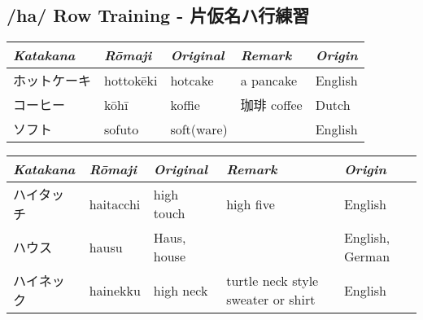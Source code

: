 \subsection{/ha/ Row Training - 片仮名ハ行練習}\label{sec:HaRowTraining}
\Padding
\begin{longtable}[c]{p{3cm}p{2cm}p{3cm}p{5cm}p{2cm}}
\textit{Katakana}&\textit{Rōmaji}&\textit{Original}&\textit{Remark}&\textit{Origin}\\\hline
ホットケーキ&hottokēki&hotcake    &a pancake                         &English\\
コーヒー    &kōhī     &koffie     &珈琲  coffee                      &Dutch\\
ソフト      &sofuto   &soft(ware) &                                  &English \\
\end{longtable}



\newpage
\Padding
\begin{longtable}[c]{p{2cm}p{2cm}p{3cm}p{6cm}p{2cm}}
\textit{Katakana}&\textit{Rōmaji}&\textit{Original}&\textit{Remark}&\textit{Origin}\\\hline
ハイタッチ  &haitacchi&high touch &high five                         &English\\
ハウス      &hausu    &Haus, house&                                  &English, German\\
ハイネック  &hainekku &high neck  &turtle neck style sweater or shirt&English\\
\end{longtable}


\newpage

